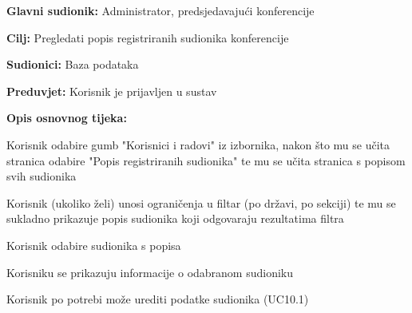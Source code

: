					\noindent {}
					\begin{packed_item}
						
						\item \textbf{Glavni sudionik: } Administrator, predsjedavajući konferencije
						\item  \textbf{Cilj:} Pregledati popis registriranih sudionika konferencije
						\item  \textbf{Sudionici:} Baza podataka
						\item  \textbf{Preduvjet:} Korisnik je prijavljen u sustav
						\item  \textbf{Opis osnovnog tijeka:}
						
						\item[] \begin{packed_enum}
							
							\item Korisnik odabire gumb "Korisnici i radovi" iz izbornika, nakon što mu se učita stranica odabire "Popis registriranih sudionika" te mu se učita stranica s popisom svih sudionika
							\item Korisnik (ukoliko želi) unosi ograničenja u filtar (po državi, po sekciji) te mu se sukladno prikazuje popis sudionika koji odgovaraju rezultatima filtra
							\item Korisnik odabire sudionika s popisa
							\item Korisniku se prikazuju informacije o odabranom sudioniku
							\item Korisnik po potrebi može urediti podatke sudionika (UC10.1)
							
							
						\end{packed_enum}
						
					\end{packed_item}
					
